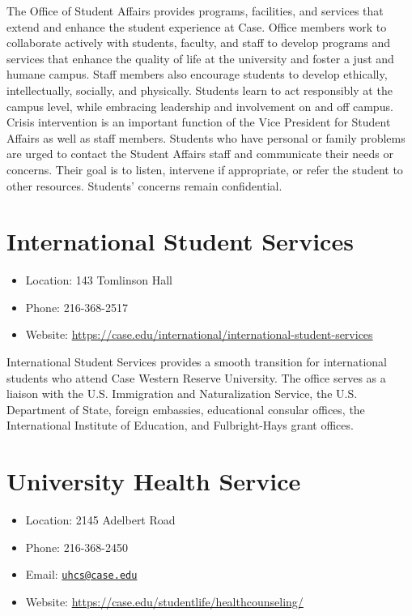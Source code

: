 \documentclass[
]{book}
\providecommand{\tightlist}{%
  \setlength{\itemsep}{0pt}\setlength{\parskip}{0pt}}
\begin{document}
The Office of Student Affairs provides programs, facilities, and services that extend and enhance the student experience at Case. Office members work to collaborate actively with students, faculty, and staff to develop programs and services that enhance the quality of life at the university and foster a just and humane campus. Staff members also encourage students to develop ethically, intellectually, socially, and physically. Students learn to act responsibly at the campus level, while embracing leadership and involvement on and off campus. Crisis intervention is an important function of the Vice President for Student Affairs as well as staff members. Students who have personal or family problems are urged to contact the Student Affairs staff and communicate their needs or concerns. Their goal is to listen, intervene if appropriate, or refer the student to other resources. Students' concerns remain confidential.

\hypertarget{international-student-services}{%
\section{International Student Services}\label{international-student-services}}

\begin{itemize}
\tightlist
\item
  Location: 143 Tomlinson Hall
\item
  Phone: 216-368-2517
\item
  Website: \url{https://case.edu/international/international-student-services}
\end{itemize}

International Student Services provides a smooth transition for international students who attend Case Western Reserve University. The office serves as a liaison with the U.S. Immigration and Naturalization Service, the U.S. Department of State, foreign embassies, educational consular offices, the International Institute of Education, and Fulbright-Hays grant offices.

\hypertarget{university-health-service}{%
\section{University Health Service}\label{university-health-service}}

\begin{itemize}
\tightlist
\item
  Location: 2145 Adelbert Road
\item
  Phone: 216-368-2450
\item
  Email: \href{mailto:uhcs@case.edu}{\nolinkurl{uhcs@case.edu}}
\item
  Website: \url{https://case.edu/studentlife/healthcounseling/}
\end{itemize}
\end{document}
